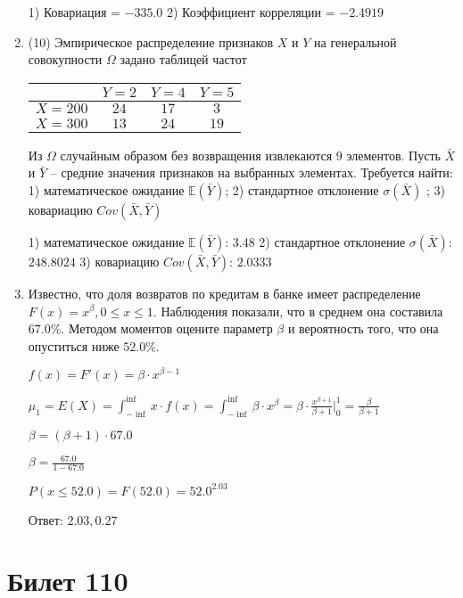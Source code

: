 \documentclass[a4paper,12pt]{article}
\begin{document}
\begin{enumerate}
1) Ковариация = $-335.0$
2) Коэффициент корреляции = $-2.4919$


\item


(10) Эмпирическое распределение признаков $X$ и $Y$ на генеральной совокупности $\Omega$ задано таблицей частот  
 
\begin{tabular}{ | c | c | c | c | }
\hline
 & $Y = 2$ & $Y = 4$ & $Y = 5$  \\ \hline
$X = 200$ & $24$ & $17$ & $3$\\ \hline
$X = 300$ & $13$ & $24$ & $19$\\
\hline
\end{tabular}

Из $\Omega$ случайным образом без возвращения извлекаются $9$ элементов. 
Пусть $\bar X$ и $\bar Y$ – средние значения признаков на выбранных элементах. 
Требуется найти: 1) математическое ожидание $\mathbb{E}(\bar Y)$; 2) стандартное отклонение $\sigma(\bar X)$ ; 
3) ковариацию $Cov(\bar X, \bar Y)$




1) математическое ожидание $\mathbb{E}(\bar Y)$: $3.48$ 
2) стандартное отклонение $\sigma(\bar X)$: $248.8024$
3) ковариацию $Cov(\bar X, \bar Y)$: $2.0333$


\item

    
	Известно, что доля возвратов по кредитам в банке имеет распределение $F(x) = x^{\beta}, 0 \le x \le 1$. Наблюдения показали, что в среднем она составила $67.0$\%. Методом моментов оцените параметр $\beta$ и вероятность того, что она опуститься ниже $52.0$\%.
	


	

	$f(x) = F'(x) = \beta \cdot x^{\beta - 1}$

	$\mu_{1} = E(X) = \int_{-\inf}^{\inf}x \cdot f(x) = \int_{-\inf}^{\inf} \beta \cdot x^{\beta} = \beta \cdot \frac{x^{\beta + 1}}{\beta + 1}\bigg|_0^1 = \frac{\beta}{\beta + 1}$

	$\beta = (\beta + 1) \cdot 67.0$

	$\beta = \frac{67.0}{1 - 67.0}$

	$ P(x \le 52.0) = F(52.0) = 52.0^{2.03} $

    Ответ: $2.03, 0.27$
	


\end{enumerate}

\section{Билет 110}
\end{document}
